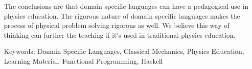 The conclusions are that domain specific languages can have a pedagogical use in
physics education. The rigorous nature of domain specific languages
makes the process of physical problem solving rigorous as well. We believe this
way of thinking can further the teaching if it's used in traditional physics
education.







\vfill
Keywords: Domain Specific Languages, Classical Mechanics, Physics Education, Learning Material, Functional Programming, Haskell


\newpage				%
\thispagestyle{empty}
\mbox{}
